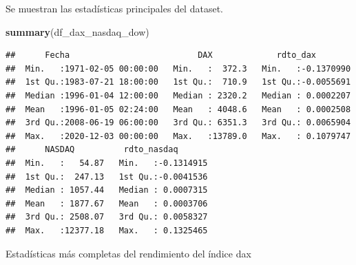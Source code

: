 \documentclass[
  11pt,
]{article}
\newenvironment{Shaded}{\begin{snugshade}}{\end{snugshade}}
\newcommand{\KeywordTok}[1]{\textcolor[rgb]{0.13,0.29,0.53}{\textbf{#1}}}
\newcommand{\NormalTok}[1]{#1}
\begin{document}
Se muestran las estadísticas principales del dataset.

\begin{Shaded}
\begin{Highlighting}[]
\KeywordTok{summary}\NormalTok{(df_dax_nasdaq_dow)}
\end{Highlighting}
\end{Shaded}

\begin{verbatim}
##      Fecha                          DAX             rdto_dax         
##  Min.   :1971-02-05 00:00:00   Min.   :  372.3   Min.   :-0.1370990  
##  1st Qu.:1983-07-21 18:00:00   1st Qu.:  710.9   1st Qu.:-0.0055691  
##  Median :1996-01-04 12:00:00   Median : 2320.2   Median : 0.0002207  
##  Mean   :1996-01-05 02:24:00   Mean   : 4048.6   Mean   : 0.0002508  
##  3rd Qu.:2008-06-19 06:00:00   3rd Qu.: 6351.3   3rd Qu.: 0.0065904  
##  Max.   :2020-12-03 00:00:00   Max.   :13789.0   Max.   : 0.1079747  
##      NASDAQ          rdto_nasdaq        
##  Min.   :   54.87   Min.   :-0.1314915  
##  1st Qu.:  247.13   1st Qu.:-0.0041536  
##  Median : 1057.44   Median : 0.0007315  
##  Mean   : 1877.67   Mean   : 0.0003706  
##  3rd Qu.: 2508.07   3rd Qu.: 0.0058327  
##  Max.   :12377.18   Max.   : 0.1325465
\end{verbatim}

Estadísticas más completas del rendimiento del índice dax
\end{document}
